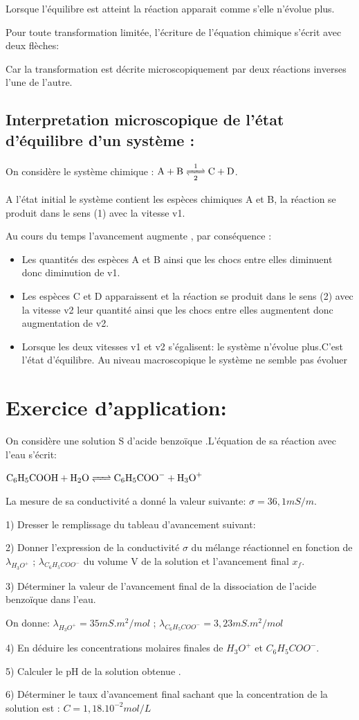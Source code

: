 \documentclass[12pt]{article}
\begin{document}
Lorsque l'équilibre  est atteint la réaction apparait comme s'elle n'évolue plus.

Pour toute transformation limitée, l'écriture de l'équation chimique s'écrit avec deux flèches: \ce{ <=> }

Car la transformation est décrite microscopiquement par deux réactions inverses l'une de l'autre.

\subsection{Interpretation microscopique de l'état d'équilibre d'un système : }
On considère le système chimique : $\ce{A + B <=>[1][2] C + D}$.

A l'état initial le système contient les espèces chimiques A et B, la réaction se produit dans le sens (1) avec la vitesse v1.

Au cours du temps l'avancement augmente , par conséquence :
\begin{itemize}

	\item Les quantités des espèces A et B ainsi que les chocs entre elles diminuent donc diminution de v1.
	\item  Les espèces C et D apparaissent et la réaction se produit dans le sens (2) avec la vitesse v2 leur quantité ainsi que les chocs entre elles augmentent donc augmentation de v2.

	\item Lorsque les deux vitesses v1 et v2 s'égalisent: le système n'évolue plus.C'est l'état d'équilibre.
Au niveau macroscopique le système ne semble pas évoluer
\end{itemize}
\section{Exercice d'application:}
On considère une solution S d'acide benzoïque .L'équation de sa réaction avec l'eau s'écrit: 

$\ce{C_6H_5COOH + H_2O <=> C_6H_5COO^- + H_3O^+}$

La mesure de sa conductivité a donné la valeur suivante: $\sigma = 36,1 mS/m$.

1) Dresser le remplissage du tableau d'avancement suivant:

2) Donner l'expression de la conductivité $\sigma $ du mélange réactionnel en fonction de $\lambda_{H_3O^+}$ ; $\lambda_{C_6H_5COO^-}$  du volume V de la solution et l'avancement final $x_f$.

3) Déterminer la valeur de l'avancement final de la dissociation de l'acide benzoïque dans l'eau.

On donne: $\lambda_{H_3O^+} = 35 mS.m^2/mol$ ; $\lambda_{C_6H_5COO^-} = 3,23 mS.m^2/mol$

4) En déduire les concentrations molaires finales de $H_3O^+$ et $C_6H_5COO^-$.

5) Calculer le pH de la solution obtenue .

6) Déterminer le taux d'avancement final sachant que la concentration de la solution est : 
$C=1,18.10^{-2}mol/L$
\end{document}
